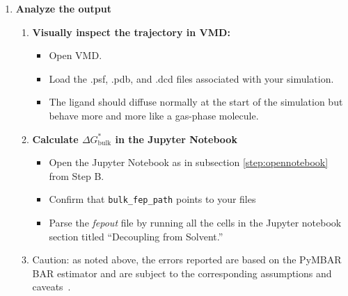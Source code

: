 \documentclass[9pt,tutorial,pubversion]{Styling/livecoms}
\newcommand{\filepath}[1]{\textit{#1}}
\newcommand{\textInput}[1]{\texttt{#1}}
\begin{document}
\begin{enumerate}
        \item \textbf{Analyze the output} \label{step:analyzeBulk}
        \begin{enumerate}[label=\alph*., ref=\theenumi.\alph*]
            \item \textbf{Visually inspect the trajectory in VMD:}
            \begin{itemize}
                \item Open VMD.
                \item Load the .psf, .pdb, and .dcd files associated with your simulation.
                \item The ligand should diffuse normally at the start of the simulation but behave more and more like a gas-phase molecule.
            \end{itemize}
            \item \textbf{Calculate $\Delta G^*_\mathrm{bulk}$ in the Jupyter Notebook}
            \begin{itemize}
                \item Open the Jupyter Notebook as in subsection \ref{step:opennotebook} from Step B.
                \item Confirm that \textInput{bulk\_fep\_path} points to your files
                \item Parse the \filepath{fepout} file by running all the cells in the Jupyter notebook section titled ``Decoupling from Solvent.''
            \end{itemize}
            \item Caution: as noted above, the errors reported are based on the PyMBAR BAR estimator and are subject to the corresponding assumptions and caveats~\cite{shirts2008statistically}.
        \end{enumerate}

    \end{enumerate}
\end{document}
